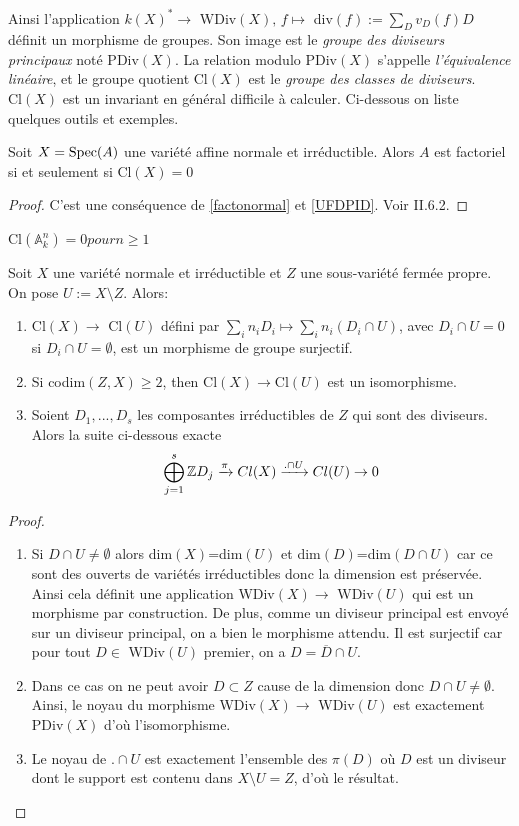 Ainsi l'application $k(X)^*\rightarrow $ WDiv$(X),\, f\mapsto $ div$(f):=\sum_D v_D(f)D$ définit un morphisme de groupes. Son image est le \textit{groupe des diviseurs principaux} noté PDiv$(X)$. La relation modulo PDiv$(X)$ s'appelle \textit{l'équivalence linéaire}, et le groupe quotient Cl$(X)$ est le \textit{groupe des classes de diviseurs}.\\
Cl$(X)$ est un invariant en général difficile à calculer. Ci-dessous on liste quelques outils et exemples.


\begin{prop}
Soit $X=\operatorname{Spec}(A)$ une variété affine normale et irréductible. Alors $A$ est factoriel si et seulement si Cl$(X)=0$
\end{prop}
\begin{proof}
C'est une conséquence de \ref{factonormal} et \ref{UFDPID}. Voir \cite{Hartshorne} II.6.2.
\end{proof}

\begin{cor}
Cl$(\mathbb{A} ^n_k)=0 pour n\geq 1$
\end{cor}

\begin{thm}\label{divexactseq}
Soit $X$ une variété normale et irréductible et $Z$ une sous-variété fermée propre. On pose $U:=X\setminus Z$. Alors:
\begin{enumerate}
\item Cl$(X)\rightarrow$ Cl$(U)$ défini par $\sum_i n_iD_i\mapsto \sum_i n_i(D_i\cap U)$, avec $D_i\cap U = 0$ si $D_i\cap U=\emptyset $, est un morphisme de groupe surjectif.
\item Si codim$(Z,X)\geq 2$, then Cl$(X)\rightarrow$Cl$(U)$ est un isomorphisme.
\item Soient $D_1,..., D_s$ les composantes irréductibles de $Z$ qui sont des diviseurs. Alors la suite ci-dessous exacte $$\bigoplus_{j=1}^s \mathbb{Z} D_j \xrightarrow{\pi} Cl(X) \xrightarrow{.\cap U} Cl(U) \rightarrow 0 $$
\end{enumerate}
\end{thm}
\begin{proof}
\begin{enumerate}
\item Si $D\cap U\neq \emptyset$ alors dim$(X)$=dim$(U)$ et dim$(D)$=dim$(D\cap U)$ car ce sont des ouverts de variétés irréductibles donc la dimension est préservée. Ainsi cela définit une application WDiv$(X)\rightarrow$ WDiv$(U)$ qui est un morphisme par construction. De plus, comme un diviseur principal est envoyé sur un diviseur principal, on a bien le morphisme attendu. Il est surjectif car pour tout $D\in$ WDiv$(U)$ premier, on a $D=\overline{D}\cap U$.
\item Dans ce cas on ne peut avoir $D\subset Z$ cause de la dimension donc $D\cap U\neq \emptyset$. Ainsi, le noyau du morphisme WDiv$(X)\rightarrow$ WDiv$(U)$ est exactement PDiv$(X)$ d'où l'isomorphisme.
\item Le noyau de $.\cap U$ est exactement l'ensemble des $\pi(D)$ où $D$ est un diviseur dont le support est contenu dans $X\setminus U=Z$, d'où le résultat.
\end{enumerate}
\end{proof}

